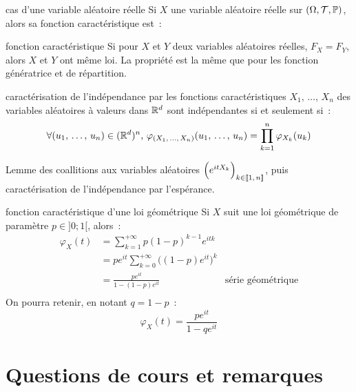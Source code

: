 \begin{remarque}{}{cas d'une variable aléatoire réelle}
    Si $X$ une variable aléatoire réelle sur $(\Omega, \mathcal{T}, \mathbb{P})$, alors sa fonction caractéristique est~:
\end{remarque}

\begin{remarque}{}{fonction caractéristique}
    Si pour $X$ et $Y$ deux variables aléatoires réelles, $F_X = F_Y$, alors $X$ et $Y$ ont même loi. La propriété est la même que pour les fonction génératrice et de répartition.
\end{remarque}

\begin{proposition}{}{caractérisation de l'indépendance par les fonctions caractéristiques}
    $X_1,\, \dots,\, X_n$ des variables aléatoires à valeurs dans $\mathbb{R}^d$ sont indépendantes si et seulement si~:
    $$\forall (u_1,\, \dots,\, u_n) \in (\mathbb{R}^d)^n,\, \varphi_{(X_1,\, \dots,\, X_n)}(u_1,\, \dots,\, u_n) = \prod_{k=1}^n \varphi_{X_k}(u_k)$$
\end{proposition}

\begin{demonstration}
    Lemme des coallitions aux variables aléatoires $\Big(e^{itX_k}\Big)_{k \in \llbracket 1 ,\, n \rrbracket}$, puis caractérisation de l'indépendance par l'espérance.
\end{demonstration}

\begin{exemple}{}{fonction caractéristique d'une loi géométrique}
    Si $X$ suit une loi géométrique de paramètre $p \in ]0; 1[$, alors~:
    \begin{align*}
        \varphi_X(t) &= \sum_{k=1}^{+\infty} p(1-p)^{k-1} e^{itk} \\
        &= pe^{it} \sum_{k=0}^{+\infty} \Big((1-p)e^{it}\Big)^k \\
        &= \frac{pe^{it}}{1-(1-p)e^{it}} \qquad &\text{série géométrique}\\
    \end{align*}
    On pourra retenir, en notant $q = 1-p$~:
    $$\varphi_X(t) = \frac{pe^{it}}{1-qe^{it}}$$
    
\end{exemple}


\section*{Questions de cours et remarques}

